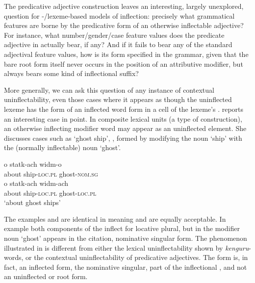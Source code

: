\documentclass[output=paper,colorlinks,citecolor=brown]{langscibook}
\begin{document}
The  predicative adjective construction leaves an interesting, largely unexplored, question for -/lexeme-based models of inflection: precisely what grammatical features are borne by  the  predicative form  of an otherwise inflectable  adjective? For instance, what number/gender/case feature values does the predicate adjective  in  actually bear, if any? And if it fails to bear any of the standard adjectival feature values, how is its form specified in the grammar, given that the bare root form  itself never occurs in the position of an attributive modifier, but always bears some kind of inflectional suffix? 

More generally, we can ask this question of any instance of contextual uninflectability, even those cases where it appears as though the uninflected lexeme has the form of an inflected word form in a cell of the lexeme's . \citet{cetnarowska2021} reports an interesting case in point. In  composite lexical units (a type of  construction), an otherwise inflecting modifier word may appear as an uninflected element.  She discusses cases such as  `ghost ship', , formed by modifying the noun  `ship' with the (normally inflectable) noun  `ghost'.

\ea\label{statekwidmo}	
\begin{xlist}
	\ex\label{widmo}
	\gll	o		statk-ach 		widm-o		\\
	about		ship-{\textsc{loc.pl}}	ghost-{\textsc{nom.sg}}\\
	
	\ex\label{widmach}
	\gll	o		statk-ach 		widm-ach		\\
	about		ship-{\textsc{loc.pl}}	ghost-{\textsc{loc.pl}}\\
	\glt		`about ghost ships'
	
\end{xlist}
\z

\noindent%
The examples  and   are identical in meaning and are equally acceptable. In example   both components of the  inflect for locative plural, but in  the modifier noun  `ghost' appears in the citation, nominative singular form.  The phenomenon illustrated in   is different from either the lexical uninflectability shown by  \textit{kenguru}-words, or the contextual uninflectability of  predicative adjectives. The form  is, in fact, an inflected form, the nominative singular, part of the inflectional , and not an uninflected  or root form. 
\end{document}
